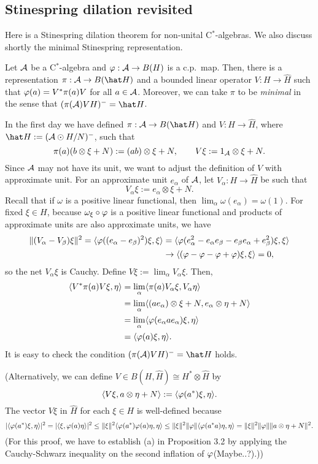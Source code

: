 \documentclass{../../../small}
\begin{document}
\subsection{Stinespring dilation revisited}

Here is a Stinespring dilation theorem for non-unital C$^*$-algebras.
We also discuss shortly the minimal Stinespring representation.

\begin{thm}
Let $\mathcal{A}$ be a C$^*$-algebra and $\varphi:\mathcal{A}\to B(H)$ is a c.p.~map.
Then, there is a representation $\pi:\cA\to B(\hat H)$ and a bounded linear operator $V:H\to\hat H$ such that $\varphi(a)=V^*\pi(a)V$ for all $a\in\mathcal{A}$.
Moreover, we can take $\pi$ to be \emph{minimal} in the sense that $(\pi(\cA)VH)^-=\hat H$.
\end{thm}
\begin{pf}
In the first day we have defined $\pi:\cA\to B(\hat H)$ and $V:H\to\hat H$, where $\hat H:=(\cA\odot H/N)^-$, such that
\[\pi(a)(b\otimes\xi+N):=(ab)\otimes\xi+N,\qquad V\xi:=1_{\mathcal{A}}\otimes\xi+N.\]
Since $\mathcal{A}$ may not have its unit, we want to adjust the definition of $V$ with approximate unit.
For an approximate unit $e_\alpha$ of $\mathcal{A}$, let $V_\alpha:H\to\hat H$ be such that
\[V_\alpha\xi:=e_\alpha\otimes\xi+N.\]
Recall that if $\omega$ is a positive linear functional, then $\lim_\alpha\omega(e_\alpha)=\omega(1)$.
For fixed $\xi\in H$, because $\omega_\xi\circ\varphi$ is a positive linear functional and products of approximate units are also approximate units, we have
\begin{align*}
\|(V_\alpha-V_\beta)\xi\|^2=\langle\varphi((e_\alpha-e_\beta)^2)\xi,\xi\rangle&=\langle\varphi(e_\alpha^2-e_\alpha e_\beta-e_\beta e_\alpha+e_\beta^2)\xi,\xi\rangle\\
&\to\langle(\varphi-\varphi-\varphi+\varphi)\xi,\xi\rangle=0,
\end{align*}
so the net $V_\alpha\xi$ is Cauchy.
Define $V\xi:=\lim_\alpha V_\alpha\xi$.
Then,
\begin{align*}
\langle V^*\pi(a)V\xi,\eta\rangle
&=\lim_\alpha\langle\pi(a)V_\alpha\xi,V_\alpha\eta\rangle\\
&=\lim_\alpha\langle(ae_\alpha)\otimes\xi+N,e_\alpha\otimes\eta+N\rangle\\
&=\lim_\alpha\langle\varphi(e_\alpha ae_\alpha)\xi,\eta\rangle\\
&=\langle\varphi(a)\xi,\eta\rangle.
\end{align*}
It is easy to check the condition $(\pi(\cA)VH)^-=\hat H$ holds.

(Alternatively, we can define $V\in B(H,\hat H)\cong H^*\otimes\hat H$ by
\[\langle V\xi,a\otimes\eta+N\rangle:=\langle\varphi(a^*)\xi,\eta\rangle.\]
The vector $V\xi$ in $\hat H$ for each $\xi\in H$ is well-defined because
\[|\langle\varphi(a^*)\xi,\eta\rangle|^2=|\langle\xi,\varphi(a)\eta\rangle|^2\le\|\xi\|^2\langle\varphi(a^*)\varphi(a)\eta,\eta\rangle\le\|\xi\|^2\|\varphi\|\langle\varphi(a^*a)\eta,\eta\rangle=\|\xi\|^2\|\varphi\|\|a\otimes\eta+N\|^2.\]
(For this proof, we have to establish (a) in Proposition 3.2 by applying the Cauchy-Schwarz inequality on the second inflation of $\varphi$(Maybe..?).))
\end{pf}
\end{document}
